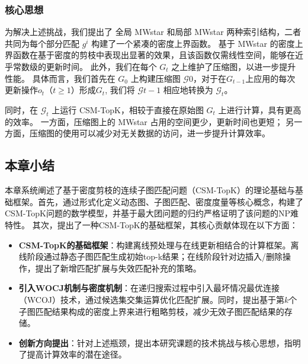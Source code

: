 \subsubsection{核心思想}

为解决上述挑战，我们提出了 全局 MWstar 和局部 MWstar 两种索引结构，二者共同为每个部分匹配 $g^i$ 构建了一个紧凑的密度上界函数。
基于 MWstar 的密度上界函数在基于密度的剪枝中表现出显著的效果，且该函数仅需线性空间，能够在近乎常数级的更新时间。
此外，我们在每个 $G_t$ 之上维护了压缩图，以进一步提升性能。
具体而言，我们首先在 $G_0$ 上构建压缩图 $\mathcal{G}0$，对于在$G_{t-1}$上应用的每次更新操作$o_t$（$t \geq 1$）形成$G_t$,
我们将 $\mathcal{G}{t-1}$ 相应地转换为 $\mathcal{G}_t$。

同时，在 $\mathcal{G}_t$ 上运行 CSM-TopK，相较于直接在原始图 $G_t$ 上进行计算，具有更高的效率。
一方面，压缩图上的 MWstar 占用的空间更少，更新时间也更短；
另一方面，压缩图的使用可以减少对无关数据的访问，进一步提升计算效率。
\subsection{本章小结}
本章系统阐述了基于密度剪枝的连续子图匹配问题（CSM-TopK）的理论基础与基础框架。首先，通过形式化定义动态图、子图匹配、密度度量等核心概念，构建了CSM-TopK问题的数学模型，并基于最大团问题的归约严格证明了该问题的NP难特性。
其次，提出了一种CSM-TopK的基础框架，其核心贡献体现在以下方面：
\begin{itemize}
\item \textbf{CSM-TopK的基础框架}：构建离线预处理与在线更新相结合的计算框架。离线阶段通过静态子图匹配生成初始top-k结果；在线阶段针对边插入/删除操作，提出了新增匹配扩展与失效匹配补充的策略。

\item \textbf{引入WOCJ机制与密度机制}：在递归搜索过程中引入最坏情况最优连接（WCOJ）技术，通过候选集交集运算优化匹配扩展。同时，提出基于第$k$个子图匹配结果构成的密度上界来进行粗略剪枝，减少无效子图匹配结果的存储。

\item \textbf{创新方向提出}：针对上述瓶颈，提出本研究课题的技术挑战与核心思想，指明了提高计算效率的潜在途径。
\end{itemize}    
